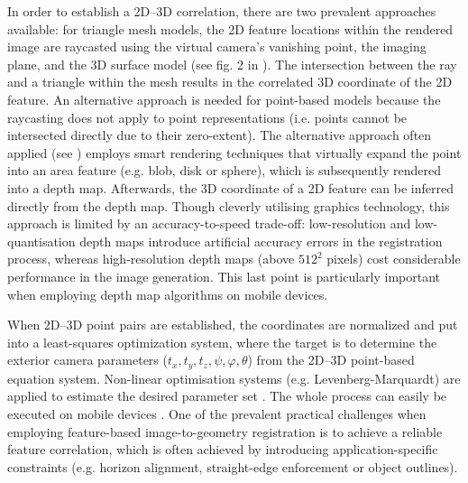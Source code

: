 \documentclass[review]{elsarticle}
\begin{document}
In order to establish a 2D--3D correlation, there are two prevalent approaches available: for triangle mesh models, the 2D feature locations within the rendered image are raycasted using the virtual camera's vanishing point, the imaging plane, and the 3D surface model (see fig. 2 in \cite{Kehl2016_ISPRS}). The intersection between the ray and a triangle within the mesh results in the correlated 3D coordinate of the 2D feature. An alternative approach is needed for point-based models because the raycasting does not apply to point representations (i.e. points cannot be intersected directly due to their zero-extent). The alternative approach often applied (see \cite{Sibbing2013,Sattler2011,Rodriguez2012,Garcia2015}) employs smart rendering techniques that virtually expand the point into an area feature (e.g. blob, disk or sphere), which is subsequently rendered into a depth map. Afterwards, the 3D coordinate of a 2D feature can be inferred directly from the depth map. Though cleverly utilising graphics technology, this approach is limited by an accuracy-to-speed trade-off: low-resolution and low-quantisation depth maps introduce artificial accuracy errors in the registration process, whereas high-resolution depth maps (above $512^2$ pixels) cost considerable performance in the image generation. This last point is particularly important when employing depth map algorithms on mobile devices.

When 2D--3D point pairs are established, the coordinates are normalized and put into a least-squares optimization system, where the target is to determine the exterior camera parameters ($t_x,t_y,t_z,\psi,\varphi,\theta$) from the 2D--3D point-based equation system. Non-linear optimisation systems (e.g. Levenberg-Marquardt) are applied to estimate the desired parameter set \cite{Torr2000}. The whole process can easily be executed on mobile devices \cite{Kehl2016_ISPRS}. One of the prevalent practical challenges when employing feature-based image-to-geometry registration is to achieve a reliable feature correlation, which is often achieved by introducing application-specific constraints (e.g. horizon alignment, straight-edge enforcement or object outlines).
\end{document}
